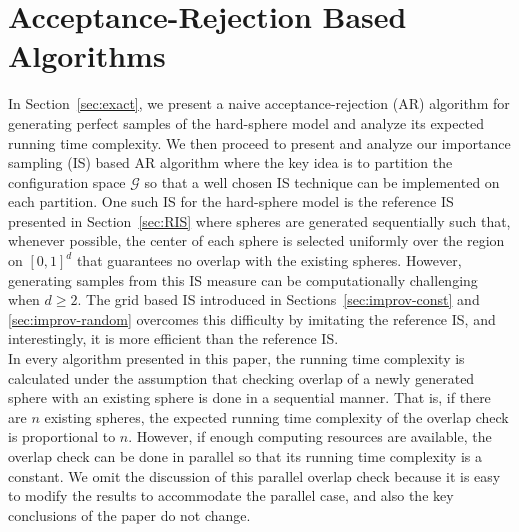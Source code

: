 \documentclass[11pt]{article}
\begin{document}
\section{Acceptance-Rejection Based Algorithms}
\label{sec:AR_methods}
In Section~\ref{sec:exact}, we present a naive acceptance-rejection (AR) algorithm for generating perfect samples of the hard-sphere model and analyze its expected running time complexity. We then proceed to present and analyze our importance sampling (IS) based AR algorithm where the key idea is to partition the configuration space $\mathscr{G}$ so that a well chosen IS technique can be  implemented on each partition.  One such IS for the hard-sphere model is the reference IS presented in Section~\ref{sec:RIS} where spheres are generated sequentially such that, whenever possible, the center of each sphere is selected uniformly over the region on $[0,1]^d$ that guarantees no overlap with the existing spheres.  However, generating samples from this IS measure can be computationally challenging when $d \geq 2$. The grid based IS introduced in Sections~\ref{sec:improv-const} and \ref{sec:improv-random}  overcomes this difficulty by imitating the reference IS, and interestingly, it is more efficient than the reference IS. \\

In every algorithm presented in this paper, the running time complexity is calculated under the assumption that checking overlap of a newly generated sphere with an existing sphere is done in a sequential manner.  That is, if there are $n$ existing spheres, the expected running time complexity of the overlap check is proportional to $n$. However, if enough computing resources are available, the overlap check can be done in parallel so that its running time complexity is a constant. We omit the discussion of this parallel overlap check because it is easy to modify the results to accommodate the parallel case, and also the key conclusions of the paper do not change.
\end{document}
